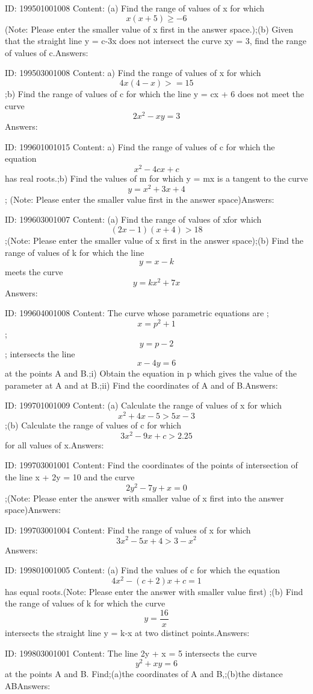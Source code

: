 \documentclass{article}
\begin{document}
ID: 199501001008
Content:
(a)	Find the range of values of x for which \[x\left ( x+5 \right )\geqslant -6\] (Note: Please enter the smaller value of x first in the answer space.);(b) Given that the straight line y = c-3x  does not intersect the curve xy = 3, find the range of values of c.Answers:

ID: 199503001008
Content:
a) Find the range of values of x for which \[4x(4-x)>=15\];b) Find the range of values of c for which the line y = cx + 6 does not meet the curve\[2x^2-xy=3\]Answers:

ID: 199601001015
Content:
a) Find the range of values of c for which the equation \[x^2-4cx+c\] has real roots.;b) Find the values of m for which y = mx is a tangent to the curve \[y = x^2+3x+4\]; (Note: Please enter the smaller value first in the answer space)Answers:

ID: 199603001007
Content:
(a) Find the range of values of xfor which \[(2x-1)(x+4) > 18\];(Note: Please enter the smaller value of x first in the answer space);(b) Find the range of values of k for which the line \[y=x-k\]  meets the curve \[y=kx^2+7x\]Answers:

ID: 199604001008
Content:
The curve whose parametric equations are ;\[x=p^2+1\] ; \[y=p-2\]; intersects the line \[x-4y=6\] at the points A and B.;i) Obtain the equation in p which gives the value of the parameter at A and at B.;ii) Find the coordinates of A and of  B.Answers:

ID: 199701001009
Content:
(a)	Calculate the range of values of x for which \[x^2+4x-5 > 5x-3\];(b)	Calculate the range of values of c for which \[3x^2-9x+c > 2.25\] for all values of x.Answers:

ID: 199703001001
Content:
Find the coordinates of the points of intersection of the line x + 2y = 10 and the curve \[2y^2-7y+x=0\];(Note: Please enter the answer with smaller value of x first into the answer space)Answers:

ID: 199703001004
Content:
Find the range of values of x for which \[3x^2-5x+4>3-x^2\]Answers:

ID: 199801001005
Content:
(a)	Find the values of c for which the equation  \[4x^2-(c+2)x+c=1\] has equal roots.(Note: Please enter the answer with smaller value first) ;(b)	Find the range of values of k for which the curve \[y=\frac{16}{x}\] intersects the straight line y = k-x at two distinct points.Answers:

ID: 199803001001
Content:
The line 2y + x = 5 intersects the curve \[y^2+xy=6\] at the points A and B. Find;(a)the coordinates of A and B,;(b)the distance ABAnswers:
\end{document}
